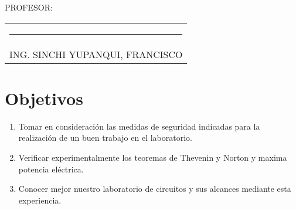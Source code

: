 \documentclass[a4paper,11pt]{report}
\begin{document}

{\large PROFESOR:} \\[2cm]
\begin{center}
\begin{tabular}{c}
\rule[3pt]{4.8in}{1pt}\\[1pt]
ING. SINCHI YUPANQUI, FRANCISCO 
\end{tabular}
\end{center}
\vfill
\newpage
\tableofcontents
\newpage
{} %
\setcounter{page}{1}  %
\chapter{Objetivos}
\begin{enumerate}
\item Tomar en consideración las medidas de seguridad indicadas para la realización de un buen trabajo en el laboratorio.
\item Verificar experimentalmente los teoremas de Thevenin y Norton y  maxima potencia eléctrica.
\item Conocer mejor nuestro laboratorio de circuitos y sus alcances mediante esta experiencia.
\end{enumerate}
\end{document}
